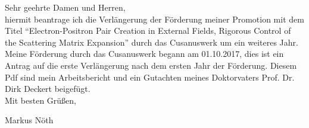 \documentclass[a4paper,12pt]{article}
\begin{document}
Sehr geehrte Damen und Herren,\\

hiermit beantrage ich die Verlängerung der Förderung meiner Promotion mit dem Titel ``Electron-Positron Pair Creation in External Fields, 
Rigorous Control of the Scattering Matrix Expansion'' durch das Cusanuswerk um ein weiteres Jahr. 
Meine Förderung durch das Cusanuswerk begann am 01.10.2017, dies 
ist ein Antrag auf die erste Verlängerung nach dem ersten Jahr der Förderung. Diesem Pdf sind mein Arbeitsbericht und
ein Gutachten meines Doktorvaters Prof. Dr. Dirk Deckert beigefügt.\\

Mit besten Grüßen,

Markus Nöth
\end{document}
